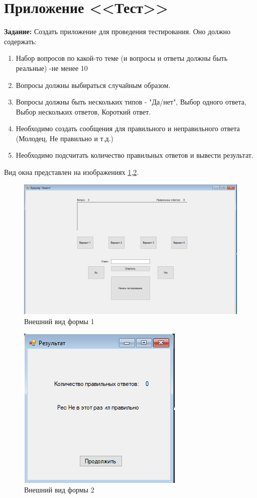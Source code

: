 \section{Приложение <<Тест>>}

\textbf{Задание:} Создать приложение для проведения тестирования. Оно должно содержать:

\begin{enumerate}
    \item Набор вопросов по какой-то теме (и вопросы и ответы должны быть реальные) -не менее 10
    \item Вопросы должны выбираться случайным образом.
    \item Вопросы должны быть нескольких типов - "Да/нет", Выбор одного ответа, Выбор нескольких ответов, Короткий ответ.
    \item Необходимо создать сообщения для правильного и неправильного ответа (Молодец, Не правильно и т.д.)
    \item Необходимо подсчитать количество правильных ответов и вывести результат.
\end{enumerate}
Вид окна представлен на изображениях \ref{fig:task9_form1},\ref{fig:task9_form2}.
\begin{figure}[H]
    \centering
    \includegraphics[scale=0.6]{task9/form1.png}
    \caption{Внешний вид формы 1}
    \label{fig:task9_form1}
\end{figure}
\begin{figure}[H]
    \centering
    \includegraphics[scale=0.8]{task9/form2.png}
    \caption{Внешний вид формы 2}
    \label{fig:task9_form2}
\end{figure}
